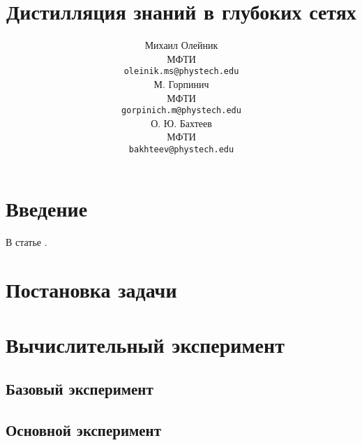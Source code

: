 \documentclass[14]{article}
\title{Дистилляция знаний в глубоких сетях}
\author{ Михаил Олейник \\ 
  МФТИ \\
  \texttt{oleinik.ms@phystech.edu} \\
  \And
  М. Горпинич \\ 
  МФТИ \\
  \texttt{gorpinich.m@phystech.edu} \\
  \And
  О. Ю. Бахтеев \\ 
  МФТИ \\ 
  \texttt{bakhteev@phystech.edu} \\
}
\date{}
\begin{document}
\maketitle

\begin{abstract}


\end{abstract}



\section{Введение}

В статье \cite{hinton2015distilling}.

\section{Постановка задачи}

\section{Вычислительный эксперимент}

\subsection{Базовый эксперимент}


\subsection{Основной эксперимент}




\newpage


\end{document}
